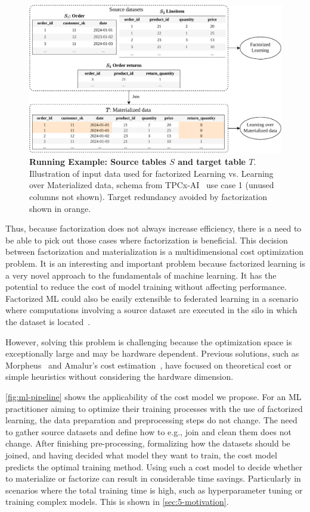 \begin{figure}[ht]
  \centering
  \includegraphics[width=0.95\linewidth]{chapters/01_introduction/figures/running-example-intro.pdf}
  \caption[Running Example: Source tables $S$ and target table $T$]{\textbf{Running Example: Source tables $S$ and target table $T$}. \\ Illustration of input data used for factorized Learning vs. Learning over Materialized data, schema from TPCx-AI~\cite{tpcx-ai} use case 1 (unused columns not shown). Target redundancy avoided by factorization shown in orange.}
  \label{fig:running-example-fac-vs-mat}
\end{figure}

Thus, because factorization does not always increase efficiency, there is a need to be able to pick out those cases where factorization is beneficial. This decision between factorization and materialization is a multidimensional cost optimization problem. It is an interesting and important problem because factorized learning is a very novel approach to the fundamentals of machine learning. It has the potential to reduce the cost of model training without affecting performance. Factorized ML could also be easily extensible to federated learning in a scenario where computations involving a source dataset are executed in the silo in which the dataset is located~\cite{amalur}.

However, solving this problem is challenging because the optimization space is exceptionally large and may be hardware dependent. Previous solutions, such as Morpheus~\cite{morpheus} and Amalur's cost estimation~\cite{amalur_tkde24}, have focused on theoretical cost or simple heuristics without considering the hardware dimension.

\autoref{fig:ml-pipeline} shows the applicability of the cost model we propose. For an ML practitioner aiming to optimize their training processes with the use of factorized learning, the data preparation and preprocessing steps do not change. The need to gather source datasets and define how to e.g., join and clean them does not change. After finishing pre-processing, formalizing how the datasets should be joined, and having decided what model they want to train, the cost model predicts the optimal training method. Using such a cost model to decide whether to materialize or factorize can result in considerable time savings. Particularly in scenarios where the total training time is high,  such as hyperparameter tuning or training complex models. This is shown in \autoref{sec:5-motivation}.

